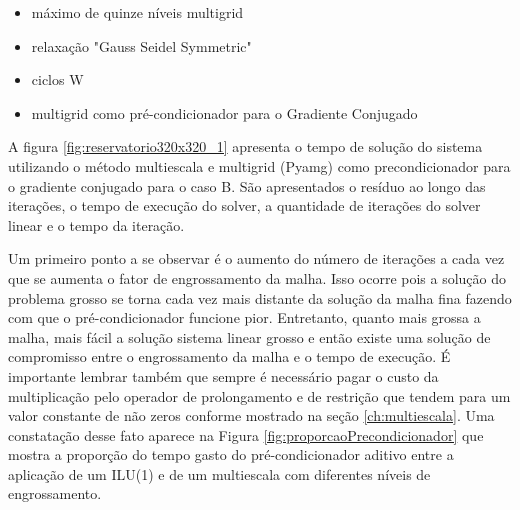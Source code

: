 \begin{itemize}
    \item máximo de quinze níveis multigrid
    \item relaxação "Gauss Seidel Symmetric" 
    \item ciclos W
    \item multigrid como pré-condicionador para o Gradiente Conjugado
\end{itemize}


A figura \ref{fig:reservatorio320x320_1} apresenta o tempo de solução do sistema utilizando o método multiescala e multigrid (Pyamg) como precondicionador para o gradiente conjugado para o caso B. São apresentados o resíduo ao longo das iterações, o tempo de execução do solver, a quantidade de iterações do solver linear e o tempo da iteração.


Um primeiro ponto a se observar é o aumento do número de iterações a cada vez que se aumenta o fator de engrossamento da malha. Isso ocorre pois a solução do problema grosso se torna cada vez mais distante da solução da malha fina fazendo com que o pré-condicionador funcione pior. Entretanto, quanto mais grossa a malha, mais fácil a solução sistema linear grosso e então existe uma solução de compromisso entre o engrossamento da malha e o tempo de execução. É importante lembrar também que sempre é necessário pagar o custo da multiplicação pelo operador de prolongamento e de restrição que tendem para um valor constante de não zeros conforme mostrado na seção \ref{ch:multiescala}. Uma constatação desse fato aparece na Figura \ref{fig:proporcaoPrecondicionador} que mostra a proporção do tempo gasto do pré-condicionador aditivo entre a aplicação de um ILU(1) e de um multiescala com diferentes níveis de engrossamento.


